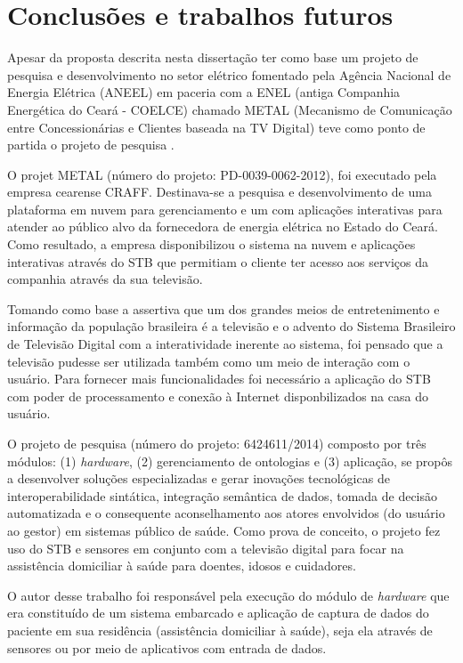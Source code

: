 \chapter{Conclusões e trabalhos futuros} \label{cap:conclusao}

Apesar da proposta descrita nesta dissertação ter como base um projeto de
pesquisa e desenvolvimento no setor elétrico fomentado pela Agência Nacional de
Energia Elétrica (ANEEL) em paceria com a ENEL (antiga Companhia Energética do
Ceará - COELCE) chamado METAL (Mecanismo de Comunicação entre Concessionárias e
Clientes baseada na TV Digital) teve como ponto de partida o projeto de pesquisa
\nextsaude.

O projet METAL (número do projeto: PD-0039-0062-2012), foi executado pela
empresa cearense CRAFF. Destinava-se a pesquisa e desenvolvimento de uma
plataforma em nuvem para gerenciamento e um \stb[] com aplicações interativas
para atender ao público alvo da fornecedora de energia elétrica no Estado do
Ceará. Como resultado, a empresa disponibilizou o sistema na nuvem e aplicações
interativas através do STB que permitiam o cliente ter acesso aos serviços da
companhia através da sua televisão.

Tomando como base a assertiva que um dos grandes meios de entretenimento e
informação da população brasileira é a televisão e o advento do Sistema
Brasileiro de Televisão Digital com a interatividade inerente ao sistema, foi
pensado que a televisão pudesse ser utilizada também como um meio de interação
com o usuário. Para fornecer mais funcionalidades foi necessário a aplicação do
STB com poder de processamento e conexão à Internet disponbilizados na casa do
usuário.   

O projeto de pesquisa \nextsaude[] (número do projeto: 6424611/2014) composto
por três módulos: (1) \textit{hardware}, (2) gerenciamento de ontologias e (3)
aplicação,  se propôs a desenvolver soluções especializadas e gerar inovações
tecnológicas de interoperabilidade sintática, integração semântica de dados,
tomada de decisão automatizada e o consequente aconselhamento aos atores
envolvidos (do usuário ao gestor) em sistemas público de saúde. Como prova de
conceito, o projeto fez uso do STB e sensores em conjunto com a televisão digital
para focar na  assistência domiciliar à saúde para doentes, idosos e cuidadores.

O autor desse trabalho foi responsável pela execução do módulo de
\textit{hardware} que era constituído de um sistema embarcado e aplicação de
captura de dados do paciente em sua residência (assistência domiciliar à
saúde), seja ela através de sensores ou por meio de aplicativos com entrada de
dados. 

